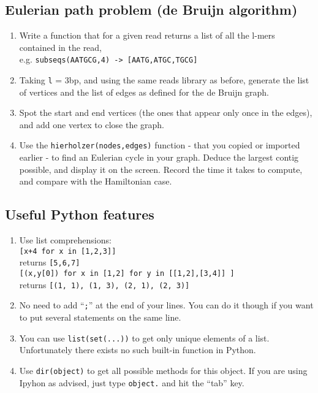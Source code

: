 \documentclass[a4paper,11pt]{article}
\begin{document}
\subsection{Eulerian path problem (de Bruijn algorithm)}
\begin{enumerate}
\item Write a function that for a given read returns a list of all the l-mers contained in the read, \\
e.g. \texttt{subseqs(AATGCG,4) ->  [AATG,ATGC,TGCG]}
\item Taking \texttt{l} = 3bp, and using the same reads library as before, generate the list of vertices and the list of edges as defined for the de Bruijn graph.
\item Spot the start and end vertices (the ones that appear only once in the edges), and add one vertex to close the graph.
\item Use the \texttt{hierholzer(nodes,edges)} function - that you copied or imported earlier - to find an Eulerian cycle in your graph. Deduce the largest contig possible, and display it on the screen. Record the time it takes to compute, and compare with the Hamiltonian case.
\end{enumerate}

\subsection{Useful Python features}
\begin{enumerate}
\item Use list comprehensions:\\
\texttt{[x+4 for x in [1,2,3]]} \\returns \texttt{[5,6,7]} \\
\texttt{[(x,y[0]) for x in [1,2] for y in [[1,2],[3,4]] ]}\\ returns \texttt{[(1, 1), (1, 3), (2, 1), (2, 3)]}
\item No need to add ``\texttt{;}'' at the end of your lines. You can do it though if you want to put several statements on the same line.
\item You can use \texttt{list(set(...))} to get only unique elements of a list. Unfortunately there exists no such built-in function in Python.
\item Use \texttt{dir(object)} to get all possible methods for this object. If you are using Ipyhon as advised, just type \texttt{object.} and hit the ``tab'' key.
\end{enumerate}
\end{document}
